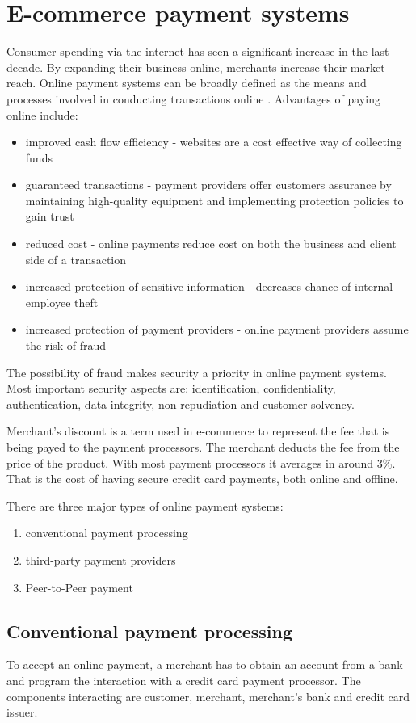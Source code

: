 \documentclass{ferseminar}
\begin{document}
\section{E-commerce payment systems}

Consumer spending via the internet has seen a significant increase in the last decade. By expanding their business online, merchants increase their market reach. Online payment systems can be broadly defined as the means and processes involved in conducting transactions online \cite{Lowry}. Advantages of paying online include:
\begin{itemize}
	\item improved cash flow efficiency - websites are a cost effective way of collecting funds
	\item guaranteed transactions - payment providers offer customers assurance by maintaining high-quality equipment and implementing protection policies to gain trust
	\item reduced cost - online payments reduce cost on both the business and client side of a transaction
	\item increased protection of sensitive information - decreases chance of internal employee theft
	\item increased protection of payment providers - online payment providers assume the risk of fraud
\end{itemize}

The possibility of fraud makes security a priority in online payment systems. Most important security aspects are: identification, confidentiality, authentication, data integrity, non-repudiation and	customer solvency.

Merchant's discount is a term used in e-commerce to represent the fee that is being payed to the payment processors. The merchant deducts the fee from the price of the product. With most payment processors it averages in around 3\%. That is the cost of having secure credit card payments, both online and offline. 

There are three major types of online payment systems:
\begin{enumerate}
	\item conventional payment processing
	\item third-party payment providers
	\item Peer-to-Peer payment
\end{enumerate}

\subsection{Conventional payment processing}
To accept an online payment, a merchant has to obtain an account from a bank and program the interaction with a credit card payment processor. The components interacting are customer, merchant, merchant's bank and credit card issuer.
\end{document}
